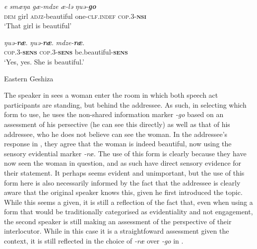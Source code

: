 \begin{exe}
    \ex\label{e:Discussion:GeshizaDialogue}
    \begin{xlist}
        \ex\label{e:Discussion:GeshizaDialogue:A}
        \gll \textit{e} \textit{smæŋa} \textit{gæ-mdze} \textit{æ-lə} \textit{ŋuə-\textbf{go}} \\
        \textsc{dem} girl \textsc{adjz}-beautiful one-\textsc{clf.indef} \textsc{cop.3-\textbf{nsi}} \\
        \glt `That girl is beautiful'

        \ex\label{e:Discussion:GeshizaDialogue:B}
        \gll \textit{ŋuə-\textbf{ræ}}. \textit{ŋuə-\textbf{ræ}}. \textit{mdze-\textbf{ræ}}. \\
        \textsc{cop.3-\textbf{sens}} \textsc{cop.3-\textbf{sens}} be.beautiful-\textsc{\textbf{sens}} \\
        \glt `Yes, yes. She is beautiful.'
    \end{xlist}
    Eastern Geshiza \cite[rGyalrongic: PRC,][593]{Honkasalo2019}
\end{exe}

The speaker in  sees a woman enter the room in which both speech act participants are standing, but behind the addressee. As such, in selecting which form to use, he uses the non-shared information marker \textit{-go} based on an assessment of his persective (he can see this directly) as well as that of his addressee, who he does not believe can see the woman. In the addressee's response in , they agree that the woman is indeed beautiful, now using the sensory evidential marker \textit{-ræ}. The use of this form is clearly because they have now seen the woman in question, and as such have direct sensory evidence for their statement. It perhaps seems evident and unimportant, but the use of this form here is also necessarily informed by the fact that the addressee is clearly aware that the original speaker knows this, given he first introduced the topic. While this seems a given, it is still a reflection of the fact that, even when using a form that would be traditionally categorised as evidentiality and not engagement, the second speaker is still making an assessment of the perspective of their interlocutor. While in this case it is a straightfoward assessment given the context, it is still reflected in the choice of \textit{-ræ} over \textit{-go} in .

